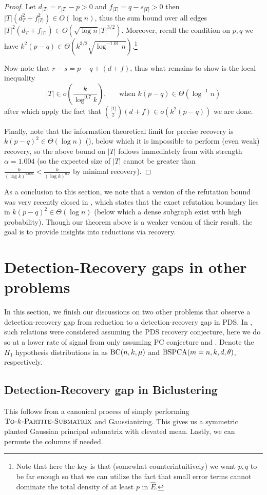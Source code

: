 \documentclass[final,12pt]{colt2023} %
\newcommand\1[1]{\mathbb{I}_{\left\{#1\right\}}}
\begin{document}
\begin{proof}
Let $d_{|T|}=r_{|T|}-p>0$ and $f_{|T|}=q-s_{|T|}>0$ then $|T|(d_{T}^2+f_{|T|}^2)\in O(\log n)$, thus the sum bound over all edges $|T|^2(d_{T}+f_{|T|})\in O(\sqrt{\log n}|T|^{3/2})$. Moreover, recall the condition on $p, q$ we have $k^2(p-q)\in\Theta(k^{3/2}\sqrt{\log^{-1.01}n}).$\footnote{Note that here the key is that (somewhat counterintuitively) we want $p, q$ to be far enough so that we can utilize the fact that small error terms cannot dominate the total density of at least $p$ in $\hat E$.}

\spac Now note that $r-s=p-q+(d+f)$, thus what remains to show is the local inequality $$|T|\in o(\frac{k}{\log^{0.7} k}),\;\;\;\;\;\;\text{when } k(p-q)\in\Theta(\log^{-1} n)$$after which apply the fact that ${|T|\choose 2}(d+f)\in o(k^2(p-q))$ we are done.

\spac Finally, note that the information theoretical limit for precise recovery is $k(p-q)^2\in\Theta(\log n)$ (), below which it is impossible to perform (even weak) recovery, so the above bound on $|T|$ follows immediately from  with strength $\alpha=1.004$ (so the expected size of $|T|$ cannot be greater than $\frac{k}{(\log k)^{1.004}}<\frac{k}{(\log k)^{0.7}}$ by minimal recovery).
\end{proof}

As a conclusion to this section, we note that a version of the refutation bound was very recently closed in \cite{cheairi2022densest}, which states that the exact refutation boundary lies in $k(p-q)^2\in\Theta(\log n)$ (below which a dense subgraph exist with high probability). Though our theorem above is a weaker version of their result, the goal is to provide insights into reductions via recovery.

\section{Detection-Recovery gaps in other problems}\label{sec: othergap}
In this section, we finish our discussions on two other problems that observe a detection-recovery gap from reduction to a detection-recovery gap in PDS. In \cite{BBH18}, such relations were considered assuming the PDS recovery conjecture, here we do so at a lower rate of signal from only assuming PC conjecture and . Denote the $H_1$ hypothesis distributions in  as $\textup{BC}(n, k, \mu)$ and $\textup{BSPCA}(m=n, k, d, \theta)$, respectively.
\subsection{Detection-Recovery gap in Biclustering}
This follows from a canonical process of simply performing $\textsc{To-}k\textsc{-Partite-Submatrix}$ and Gaussianizing. This gives us a symmetric planted Gaussian principal submatrix with elevated mean. Lastly, we can permute the columns if needed.
\end{document}
